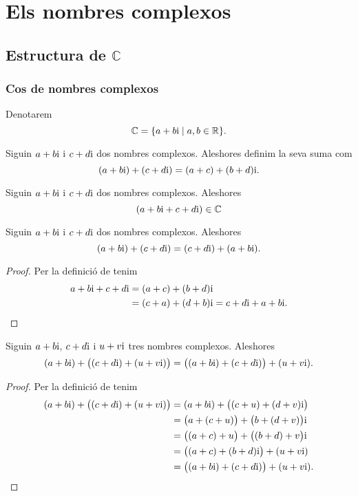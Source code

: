 \documentclass[../../Main.tex]{subfiles}
\begin{document}
\chapter{Els nombres complexos}
\section{Estructura de \ensuremath{\mathbb{C}}}
	\subsection{Cos de nombres complexos}
	\begin{notation}
		\label{notation:cos de nombres complexos}
		Denotarem
		\[\mathbb{C}=\{a+b\mathrm{i}\mid a,b\in\mathbb{R}\}.\]
	\end{notation}
	\begin{definition}
		\label{def:suma de nombres complexos}
		Siguin \(a+b\mathrm{i}\) i \(c+d\mathrm{i}\) dos nombres complexos. Aleshores definim la seva suma com
		\[(a+b\mathrm{i})+(c+d\mathrm{i})=(a+c)+(b+d)\mathrm{i}.\]
	\end{definition}
	\begin{observation}
		\label{obs:els nombres complexos estan tancats per la suma}
		Siguin \(a+b\mathrm{i}\) i \(c+d\mathrm{i}\) dos nombres complexos. Aleshores
		\[(a+b\mathrm{i}+c+d\mathrm{i})\in\mathbb{C}\]
	\end{observation}
	\begin{proposition}
		\label{prop:els nombres complexos commuten per la suma}
		Siguin \(a+b\mathrm{i}\) i \(c+d\mathrm{i}\) dos nombres complexos. Aleshores
		\[(a+b\mathrm{i})+(c+d\mathrm{i})=(c+d\mathrm{i})+(a+b\mathrm{i}).\]
		\begin{proof}
			Per la definició de  tenim
			\begin{align*}
				a+b\mathrm{i}+c+d\mathrm{i}&=(a+c)+(b+d)\mathrm{i} \\
				&=(c+a)+(d+b)\mathrm{i}=c+d\mathrm{i}+a+b\mathrm{i}.\qedhere
			\end{align*}
		\end{proof}
	\end{proposition}
	\begin{proposition}
		\label{prop:els nombres complexos són associatius per la suma}
		Siguin \(a+b\mathrm{i}\), \(c+d\mathrm{i}\) i \(u+v\mathrm{i}\) tres nombres complexos. Aleshores
		\[(a+b\mathrm{i})+\big((c+d\mathrm{i})+(u+v\mathrm{i})\big)=\big((a+b\mathrm{i})+(c+d\mathrm{i})\big)+(u+v\mathrm{i}).\]
		\begin{proof}
			Per la definició de \myref{def:suma de nombres complexos} tenim
			\begin{align*}
				(a+b\mathrm{i})+\big((c+d\mathrm{i})+(u+v\mathrm{i})\big)&=(a+b\mathrm{i})+\big((c+u)+(d+v)\mathrm{i}\big) \\
				&=\big(a+(c+u)\big)+\big(b+(d+v)\big)\mathrm{i} \\
				&=\big((a+c)+u\big)+\big((b+d)+v\big)\mathrm{i} \\
				&=\big((a+c)+(b+d)\mathrm{i}\big)+(u+v\mathrm{i}) \\
				&=\big((a+b\mathrm{i})+(c+d\mathrm{i})\big)+(u+v\mathrm{i}).\qedhere
			\end{align*}
		\end{proof}
	\end{proposition}
\end{document}
